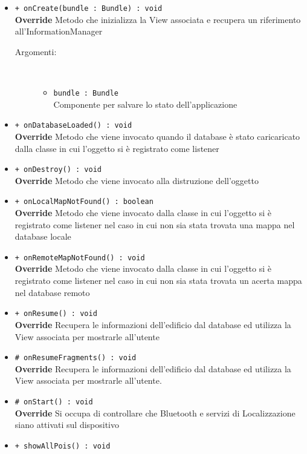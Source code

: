 \documentclass[../DefinizioneDiProdotto.tex]{subfiles}
\begin{document}
\begin{description}
\begin{itemize}
		\item \texttt{+ onCreate(bundle : Bundle) : void}\\
		\textbf{Override} Metodo che inizializza la View associata e recupera un riferimento all'InformationManager
		\begin{description}
			\item[Argomenti:] \
			\begin{itemize}
				\item \texttt{bundle : Bundle}\\
				Componente per salvare lo stato dell'applicazione\end{itemize}
		\end{description}
		\item \texttt{+ onDatabaseLoaded() : void}\\
		\textbf{Override} Metodo che viene invocato quando il database è stato caricaricato dalla classe in cui l'oggetto si è registrato come listener
		\item \texttt{+ onDestroy() : void}\\
		\textbf{Override} Metodo che viene invocato alla distruzione dell'oggetto
		\item \texttt{+ onLocalMapNotFound() : boolean}\\
		\textbf{Override} Metodo che viene invocato dalla classe in cui l'oggetto si è registrato come listener nel caso in cui non sia stata trovata una mappa nel database locale
		\item \texttt{+ onRemoteMapNotFound() : void}\\
		\textbf{Override} Metodo che viene invocato dalla classe in cui l'oggetto si è registrato come listener nel caso in cui non sia stata trovata un acerta mappa nel database remoto
		\item \texttt{+ onResume() : void}\\
		\textbf{Override} Recupera le informazioni dell'edificio dal database ed utilizza la View associata per mostrarle all'utente
		\item \texttt{\# onResumeFragments() : void}\\
		\textbf{Override} Recupera le informazioni dell'edificio dal database ed utilizza la View associata per mostrarle all'utente.
		\item \texttt{\# onStart() : void}\\
		\textbf{Override} Si occupa di controllare che Bluetooth e servizi di Localizzazione siano attivati sul dispositivo
		\item \texttt{+ showAllPois() : void}\\

\end{itemize}
\end{description}
\end{document}
